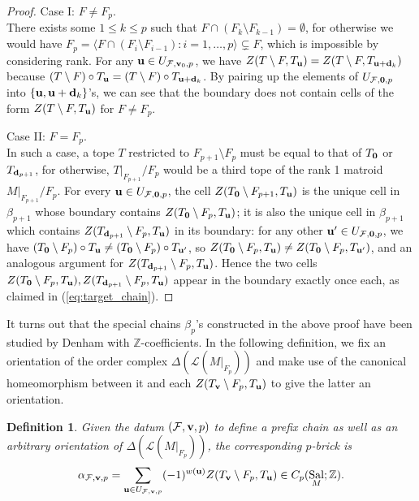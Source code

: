 \documentclass{amsart}
\newtheorem{definition}[theorem]{Definition}
\newcommand\Fcal{{\mathcal F}}
\newcommand\Lcal{{\mathcal L}}
\newcommand\dd{{\bf d}}
\newcommand\vv{{\bf v}}
\newcommand\ZZ{{\mathbb Z}}
\DeclareMathOperator{\Sal}{Sal}
\begin{document}
{\begin{proof}
Case I: $F\neq F_p$.\\
There exists some $1\leq k\leq p$ such that $F\cap(F_k\setminus F_{k-1})=\emptyset$, for otherwise we would have $F_p = \langle F\cap(F_i\setminus F_{i-1}): i=1,\ldots,p\rangle\subsetneq F$, which is impossible by considering rank.
For any ${\bf u}\in U_{\Fcal,{\bf v}_0, p}$, we have $Z(T\setminus F,T_{\bf u})=Z(T\setminus F,T_{{\bf u}+\dd_k})$ because $(T\setminus F)\circ T_{\bf u}=(T\setminus F)\circ T_{{\bf u}+\dd_k}$.
By pairing up the elements of $U_{\Fcal,{\bf 0}, p}$ into $\{{\bf u}, {\bf u}+\dd_k\}$'s, we can see that the boundary does not contain cells of the form $Z(T\setminus F,T_{\bf u})$ for $F\neq F_p$. 

Case II: $F=F_p$.\\
In such a case, a tope $T$ restricted to $F_{p+1}\setminus F_p$ must be equal to that of $T_{\bf 0}$ or $T_{\dd_{p+1}}$, for otherwise, $T|_{F_{p+1}}/F_p$ would be a third tope of the rank 1 matroid $M|_{F_{p+1}}/F_p$.
For every ${\bf u}\in U_{\Fcal,{\bf 0}, p}$, the cell $Z(T_{\bf 0}\setminus F_{p+1},T_{\bf u})$ is the unique cell in $\beta_{p+1}$ whose boundary contains $Z(T_{\bf 0}\setminus F_p,T_{\bf u})$; it is also the unique cell in $\beta_{p+1}$ which contains $Z(T_{\dd_{p+1}}\setminus F_p,T_{\bf u})$ in its boundary: for any other ${\bf u}'\in U_{\Fcal,{\bf 0}, p}$, we have $(T_{\bf 0}\setminus F_p)\circ T_{\bf u}\neq (T_{\bf 0}\setminus F_p)\circ T_{{\bf u}'}$, so $Z(T_{\bf 0}\setminus F_p,T_{\bf u})\neq Z(T_{\bf 0}\setminus F_p,T_{{\bf u}'})$, and an analogous argument for $Z(T_{\dd_{p+1}}\setminus F_p,T_{\bf u})$.
Hence the two cells $Z(T_{\bf 0}\setminus F_p,T_{\bf u}),Z(T_{\dd_{p+1}}\setminus F_p,T_{\bf u})$ appear in the boundary exactly once each, as claimed in (\ref{eq:target_chain}).
\end{proof}

It turns out that the special chains $\beta_p$'s constructed in the above proof have been studied by Denham with $\ZZ$-coefficients. In the following definition, we fix an orientation of the order complex $\Delta(\Lcal(M|_{F_p}))$ and make use of the canonical homeomorphism between it and each $Z(T_{\vv}\setminus F_p,T_{\bf u})$ to give the latter an orientation.

\begin{definition}\label{def:pbricks} \cite[Definition~2.4]{Denham_OS}
Given the datum $(\Fcal,\vv,p)$ to define a prefix chain as well as an arbitrary orientation of $\Delta(\Lcal(M|_{F_p}))$, the corresponding {\em $p$-brick} is 
$$\alpha_{\Fcal,\vv,p} = \sum_{{\bf u}\in U_{\Fcal,\vv, p}} (-1)^{w({\bf u})} Z(T_{\vv}\setminus F_p,T_{\bf u})\in C_p(\Sal_M;\ZZ).$$
\end{definition}

}
\end{document}
